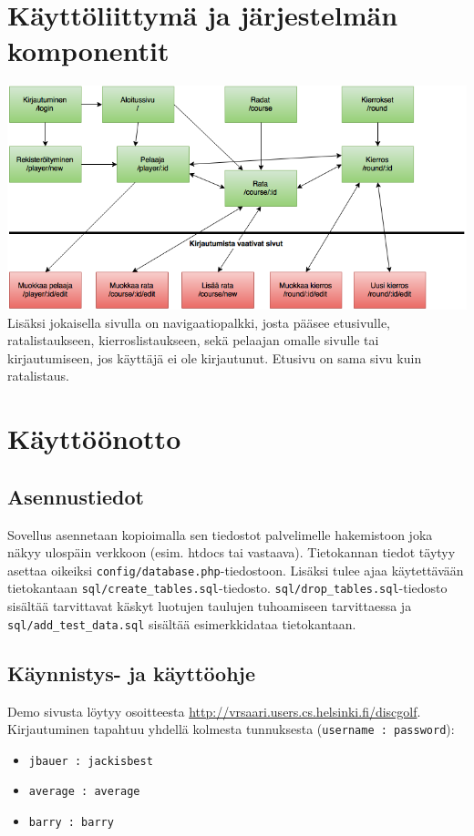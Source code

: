\documentclass[10pt,a4paper]{article}
\begin{document}
\section{Käyttöliittymä ja järjestelmän komponentit}
\includegraphics[scale=0.5]{tsoha_kayttoliittymakaavio}
Lisäksi jokaisella sivulla on navigaatiopalkki, josta pääsee etusivulle, ratalistaukseen, kierroslistaukseen, sekä pelaajan omalle sivulle tai kirjautumiseen, jos käyttäjä ei ole kirjautunut.
Etusivu on sama sivu kuin ratalistaus.
\newpage
\section{Käyttöönotto}
\subsection{Asennustiedot}
Sovellus asennetaan kopioimalla sen tiedostot palvelimelle hakemistoon joka näkyy ulospäin verkkoon (esim. htdocs tai vastaava). 
Tietokannan tiedot täytyy asettaa oikeiksi \texttt{config/database.php}-tiedostoon. 
Lisäksi tulee ajaa käytettävään tietokantaan \texttt{sql/create\_tables.sql}-tiedosto.
\texttt{sql/drop\_tables.sql}-tiedosto sisältää tarvittavat käskyt luotujen taulujen tuhoamiseen tarvittaessa ja \texttt{sql/add\_test\_data.sql} sisältää esimerkkidataa tietokantaan. 
\subsection{Käynnistys- ja käyttöohje}
Demo sivusta löytyy osoitteesta \url{http://vrsaari.users.cs.helsinki.fi/discgolf}.
Kirjautuminen tapahtuu yhdellä kolmesta tunnuksesta (\texttt{username : password}):
\begin{itemize}
\item \texttt{jbauer : jackisbest}
\item \texttt{average : average}
\item \texttt{barry : barry}
\end{itemize}
\end{document}
